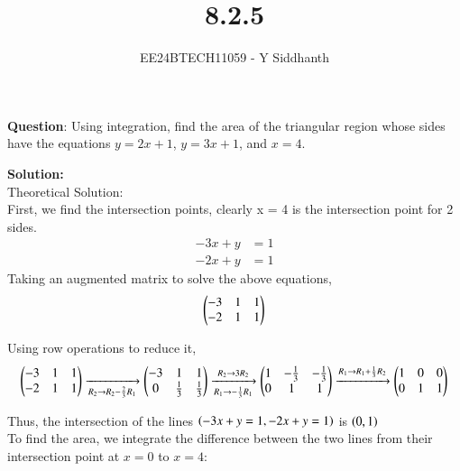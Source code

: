 \documentclass[journal]{IEEEtran}
\begin{document}
	
	
	\vspace{3cm}
	
	\title{8.2.5}
	\author{EE24BTECH11059 - Y Siddhanth}
	{\let\newpage\relax\maketitle}
	
	\renewcommand{\thefigure}{\theenumi}
	\renewcommand{\thetable}{\theenumi}
	\setlength{\intextsep}{10pt} %
	
	
	\renewcommand{\thetable}{\theenumi}
	
	
	\textbf{Question}:\newline
	Using integration, find the area of the triangular region whose sides have the equations \(y = 2x + 1\), \(y = 3x + 1\), and \(x = 4\).
	
	\textbf{Solution: }\\
	Theoretical Solution: \\
	First, we find the intersection points, clearly x = 4 is the intersection point for 2 sides.	
	\begin{align}
		-3x + y &= 1 \\ 
		-2x + y &= 1
	\end{align}
	Taking an augmented matrix to solve the above equations,
	\begin{align}
		\begin{pmatrix}-3 & 1 & 1 \\ -2 & 1 & 1 \end{pmatrix}
	\end{align}
	
	Using row operations to reduce it,
	\begin{align}
			\begin{pmatrix}-3 & 1 & 1 \\ -2 & 1 & 1 \end{pmatrix} \xrightarrow[R_2 \rightarrow R_2 - \frac{2}{3}R_1]{} \begin{pmatrix} -3 & 1 & 1 \\ 0 & \frac{1}{3} & \frac{1}{3} \end{pmatrix} \xrightarrow[R_1 \rightarrow -\frac{1}{3}R_1]{R_2 \rightarrow 3R_2} \begin{pmatrix} 1 & -\frac{1}{3} & -\frac{1}{3} \\ 0 & 1 & 1\end{pmatrix} \xrightarrow{R_1 \rightarrow R_1 + \frac{1}{3}R_2} \begin{pmatrix}1 & 0 & 0 \\ 0 & 1 & 1\end{pmatrix}
	\end{align}
	
	Thus, the intersection of the lines $\left(-3x + y = 1  , -2x + y = 1\right)$ is $\left(0,1\right)$\\
	To find the area, we integrate the difference between the two lines from their intersection point at $x=0$ to $x=4$:
	
\end{document}

